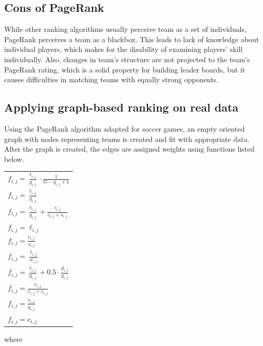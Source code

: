 \subsection{Cons of PageRank}
While other ranking algorithms usually perceive team as a set of individuals, PageRank perceives a team as a blackbox. This leads to lack of knowledge about individual players, which makes for the disability of examining players' skill individually. Also, changes in team's structure are not projected to the team's PageRank rating, which is a solid property for building leader boards, but it causes difficulties in matching teams with equally strong opponents.

\subsection{Applying graph-based ranking on real data}
Using the PageRank algorithm adapted for soccer games, an empty oriented graph with nodes representing teams is created and fit with appropriate data. After the graph is created, the edges are assigned weights using functions listed below. 

\vspace{1em}
\begin{tabular}{l}
$f_{i,j} = \frac{\ell_{i,j}}{g_{i,j}}\cdot \frac{1}{G-g_{i,j}+1}$\\[1em]
$f_{i,j} = \frac{\ell_{i,j}}{g_{i,j}}$\\[1em]
$f_{i,j} = \frac{\ell_{i,j}}{g_{i,j}} + \frac{c_{i,j}}{c_{i,j}+s_{i,j}}$\\[1em]
$f_{i,j} = \ell_{i,j}$\\[1em]
$f_{i,j} = \frac{c_{i,j}}{s_{i,j}}$\\[1em]
$f_{i,j} = \frac{\ell_{i,j}}{w_{i,j}}$\\[1em]
$f_{i,j} = \frac{\ell_{i,j}}{g_{i,j}}+0.5\cdot \frac{d_{i,j}}{g_{i,j}}$\\[1em]
$f_{i,j} = \frac{c_{i,j}}{c_{i,j}+s_{i,j}}$\\[1em]
$f_{i,j} = \frac{c_{i,j}}{g_{i,j}}$\\[1em]
$f_{i,j} = c_{i,j}$
\end{tabular}
\vspace{1em}

\noindent where\\

